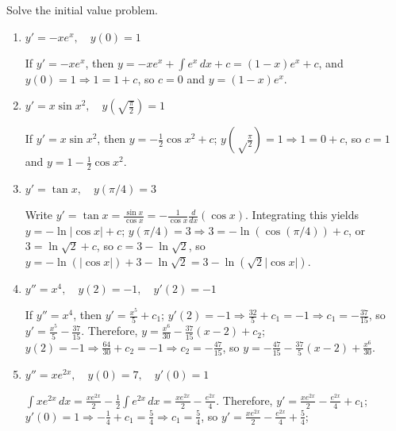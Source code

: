 \documentclass{ximera}
\begin{document}
\begin{problem}\label{exer:1.2.4}
Solve the  initial value problem.

\begin{enumerate}
\item %
 $y'=-xe^x, \quad y(0)=1$



\begin{solution}
    If $y'=-xe^x$, then
$y=-xe^x+\int e^x\,dx+c=(1-x)e^x+c$,
and $y(0)=1\Rightarrow 1=1+c$, so $c=0$ and $y=(1-x)e^x$.
\end{solution}
 
\item %
 $y'=x \sin x^2, \quad y\left(\sqrt{\frac{\pi}{2}}\right)=1$

 

 \begin{solution}
     If
$y'=x\sin x^2$, then
$y=-\frac{1}{2}\cos x^2+c$;
$y\left({\sqrt\frac{\pi}{2}}\right)=1 \Rightarrow 1=0+c$,
so $c=1$ and $y=1-\frac{1}{2}\cos x^2$.
 \end{solution}

\item %
$y'=\tan x, \quad y(\pi/4)=3$



\begin{solution}
    Write $y'=\tan x=\frac{\sin x}{\cos x}=-\frac{1}{\cos
x}\frac{d}{dx}(\cos x)$. Integrating this yields $y=-\ln|\cos x|+c$;
 $y(\pi/4)=3\Rightarrow 3=-\ln\left(\cos(\pi/4)\right)+c$, or
$3=\ln\sqrt2+c$, so $c=3-\ln\sqrt2$, so
$y=-\ln(|\cos x|)+3-\ln\sqrt2=3-\ln(\sqrt2|\cos x|)$.
\end{solution}

\item %
$y''=x^4, \quad y(2)=-1, \quad y'(2)=-1$



\begin{solution}
    If $y''=x^4$, then $y'=\frac{x^5}{5}+c_1$; $y'(2)=-1
\Rightarrow\frac{32}{5}+c_1=-1\Rightarrow c_1=-\frac{37}{15}$,
so $y'=\frac{x^5}{5}-\frac{37}{15}$. Therefore, $y=\frac{x^6}{30}
-\frac{37}{15}(x-2)+c_2$; $y(2)=-1\Rightarrow\frac{64}{30}+c_2=-1
\Rightarrow c_2=-\frac{47}{15}$, so
$y=-\frac{47}{15}-\frac{37}{5}(x-2)+\frac{x^6}{30}$.
\end{solution}

\item %
$y''=xe^{2x}, \quad y(0)=7, \quad y'(0)=1$



\begin{solution}
    $\int xe^{2x}\,dx=\frac{xe^{2x}}{2}-\frac{1}{2}
\int e^{2x}\,dx=\frac{xe^{2x}}{2}-\frac{e^{2x}}{4}$. Therefore,
$y'=\frac{xe^{2x}}{2}-\frac{e^{2x}}{4}+c_1$; $y'(0)=1\Rightarrow
-\frac{1}{4}+c_1=\frac{5}{4}\Rightarrow c_1=\frac{5}{4}$,
so $y'=\frac{xe^{2x}}{2}-\frac{e^{2x}}{4}+\frac{5}{4}$;


\end{solution}
\end{enumerate}
\end{problem}
\end{document}
